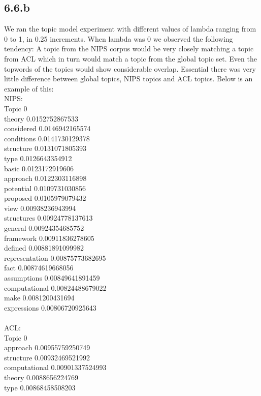 \documentclass{article}
\begin{document}
\subsection*{6.6.b}
We ran the topic model experiment with different values of lambda ranging from 0 to 1, in 0.25 increments.
When lambda was 0 we observed the following tendency:
A topic from the NIPS corpus would be very closely matching a topic from ACL which in turn would match a topic from the global topic set.
Even the topwords of the topics would show considerable overlap. Essential there was very little difference between global topics, NIPS
topics and ACL topics. Below is an example of this:\\
NIPS:\\
Topic 0\\
theory 0.0152752867533\\
considered 0.0146942165574\\
conditions 0.0141730129378\\
structure 0.0131071805393\\
type 0.0126643354912\\
basic 0.0123172919606\\
approach 0.0122303116898\\
potential 0.0109731030856\\
proposed 0.0105979079432\\
view 0.00938236943994\\
structures 0.00924778137613\\
general 0.00924354685752\\
framework 0.00911836278605\\
defined 0.00881891099982\\
representation 0.00875773682695\\
fact 0.00874619668056\\
assumptions 0.00849641891459\\
computational 0.00824488679022\\
make 0.0081200431694\\
expressions 0.00806720925643\\
\\
ACL:\\
Topic 0\\
approach 0.00955759250749\\
structure 0.00932469521992\\
computational 0.00901337524993\\
theory 0.0088656224769\\
type 0.00868458508203\\
\end{document}
